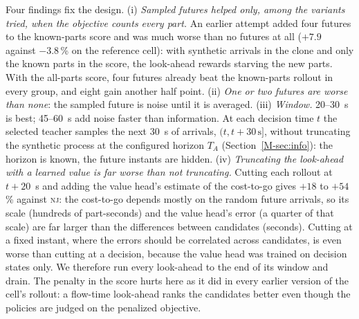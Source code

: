 \documentclass[11pt,a4paper]{article}
\theoremstyle{plain}
\theoremstyle{definition}
\theoremstyle{remark}
\newcommand{\nj}{\textsc{nj}}
\begin{document}
\begin{table}[t]
\centering\small
\caption{Expert design study: paired $\Delta$ of the penalized flow time against \nj\
[\%, 95\,\% CI] of each look-ahead run over the trained S network of
Section~\ref{sec:ladder}, on the development realizations (reference cell and heavy
variant, 30 each; 60 general cells), score = mean of the three; and seconds per episode.
``Penalty in the cost'' scores the look-ahead on the penalized objective. Bold: the chosen
expert. Legacy arrival-time tie-break (Section~\ref{M-sec:dev}).}
\label{tab:variants}
\resizebox{\linewidth}{!}{}
\end{table}

Four findings fix the design. (i) \emph{Sampled futures helped only, among the variants tried, when the objective
counts every part.} An earlier attempt added four futures to the known-parts score and
was much worse than no futures at all ($+7.9$ against $-3.8$\,\% on the reference cell):
with synthetic arrivals in the clone and only the known parts in the score, the
look-ahead rewards starving the new parts. With the all-parts score, four futures already
beat the known-parts rollout in every group, and eight gain another half point. (ii)
\emph{One or two futures are worse than none}: the sampled future is noise until it is
averaged. (iii) \emph{Window.} 20--30~s is best; 45--60~s add noise faster than
information. At each decision time $t$ the selected teacher samples the next 30~s of arrivals, $(t,t+30\,\mathrm{s}]$, without truncating the synthetic process at the configured horizon $T_A$ (Section~\ref{M-sec:info}): the horizon is known, the future instants are hidden. (iv) \emph{Truncating the look-ahead with a learned value is far worse than
not truncating.} Cutting each rollout at $t+20$~s and adding the value head's estimate of
the cost-to-go gives $+18$ to $+54$\,\% against \nj: the cost-to-go depends mostly on the
random future arrivals, so its scale (hundreds of part-seconds) and the value head's
error (a quarter of that scale) are far larger than the differences between candidates
(seconds). Cutting at a fixed instant, where the errors should be correlated across
candidates, is even worse than cutting at a decision, because the value head was trained
on decision states only. We therefore run every look-ahead to the end of its window and
drain. The penalty in the score hurts here as it did in every earlier version of the
cell's rollout: a flow-time look-ahead ranks the candidates better even though the
policies are judged on the penalized objective.
\end{document}
